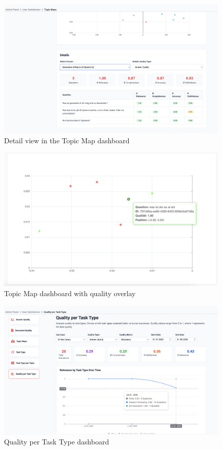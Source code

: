 \documentclass[
	english,
	ruledheaders=section,%
	class=report,%
	thesis={type=bachelor},%
	accentcolor=1b,%
	custommargins=true,%
	marginpar=false,%
	parskip=half-,%
	fontsize=11pt,%
	DIV=14,
]{tudapub}
\begin{document}
\begin{figure}[h!]
    \includegraphics[width=0.75\linewidth]{images/TopicMapsDetails.png}
    \captionsetup{list=no}
    \caption{Detail view in the Topic Map dashboard}
    \label{fig:topic_maps_details}
\end{figure}

\begin{figure}[h!]
    \includegraphics[width=0.75\linewidth]{images/TopicMapsQuality.png}
    \captionsetup{list=no}
    \caption{Topic Map dashboard with quality overlay}
    \label{fig:topic_maps_quality}
\end{figure}

\begin{figure}[h!]
    \includegraphics[width=0.75\linewidth]{images/QualityPerTaskType.png}
    \captionsetup{list=no}
    \caption{Quality per Task Type dashboard}
    \label{fig:quality_per_task_type}
\end{figure}
\end{document}
